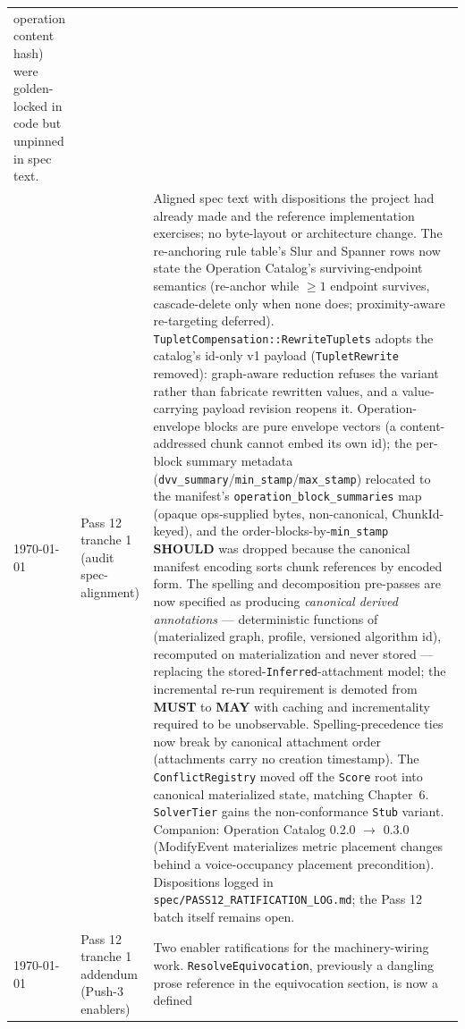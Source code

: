 \documentclass[11pt,letterpaper]{report}
\newcounter{requirement}[chapter]
\newcommand{\MUST}{\textbf{MUST}}
\newcommand{\SHOULD}{\textbf{SHOULD}}
\newcommand{\MAY}{\textbf{MAY}}
\begin{document}
\begin{longtable}{p{2cm} p{2.5cm} p{9cm}}
  operation content hash) were golden-locked in code but unpinned in
  spec text.
  \\
  \today & Pass 12 tranche 1 (audit spec-alignment) &
  Aligned spec text with dispositions the project had already made
  and the reference implementation exercises; no byte-layout or
  architecture change. The re-anchoring rule table's Slur and
  Spanner rows now state the Operation Catalog's surviving-endpoint
  semantics (re-anchor while $\geq 1$ endpoint survives,
  cascade-delete only when none does; proximity-aware re-targeting
  deferred). \texttt{TupletCompensation::RewriteTuplets} adopts the
  catalog's id-only v1 payload (\texttt{TupletRewrite} removed):
  graph-aware reduction refuses the variant rather than fabricate
  rewritten values, and a value-carrying payload revision reopens
  it. Operation-envelope blocks are pure envelope vectors (a
  content-addressed chunk cannot embed its own id); the per-block
  summary metadata
  (\texttt{dvv\_summary}/\texttt{min\_stamp}/\texttt{max\_stamp})
  relocated to the manifest's \texttt{operation\_block\_summaries}
  map (opaque ops-supplied bytes, non-canonical, ChunkId-keyed),
  and the order-blocks-by-\texttt{min\_stamp} \SHOULD{} was dropped
  because the canonical manifest encoding sorts chunk references by
  encoded form. The spelling and decomposition pre-passes are now
  specified as producing \emph{canonical derived annotations} ---
  deterministic functions of (materialized graph, profile,
  versioned algorithm id), recomputed on materialization and never
  stored --- replacing the stored-\texttt{Inferred}-attachment
  model; the incremental re-run requirement is demoted from
  \MUST{} to \MAY{} with caching and incrementality required to be
  unobservable. Spelling-precedence ties now break by canonical
  attachment order (attachments carry no creation timestamp). The
  \texttt{ConflictRegistry} moved off the \texttt{Score} root into
  canonical materialized state, matching Chapter~6.
  \texttt{SolverTier} gains the non-conformance \texttt{Stub}
  variant. Companion: Operation Catalog 0.2.0 $\rightarrow$ 0.3.0
  (ModifyEvent materializes metric placement changes behind a
  voice-occupancy placement precondition). Dispositions logged in
  \texttt{spec/PASS12\_RATIFICATION\_LOG.md}; the Pass 12 batch
  itself remains open.
  \\
  \today & Pass 12 tranche 1 addendum (Push-3 enablers) &
  Two enabler ratifications for the machinery-wiring work.
  \texttt{ResolveEquivocation}, previously a dangling prose
  reference in the equivocation section, is now a defined

\end{longtable}
\end{document}
